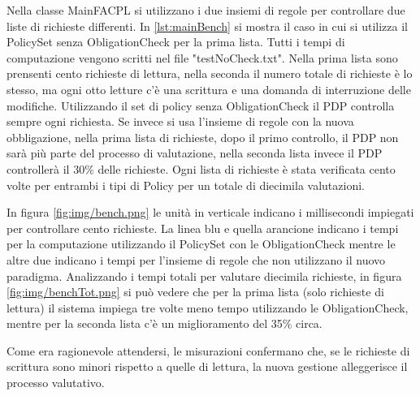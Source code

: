Nella classe MainFACPL si utilizzano i due insiemi di regole per controllare due liste di richieste differenti.
In \ref{lst:mainBench} si mostra il caso in cui si utilizza il PolicySet senza ObligationCheck per la prima lista.
Tutti i tempi di computazione vengono scritti nel file "testNoCheck.txt".
Nella prima lista sono prensenti cento richieste di lettura, nella seconda il numero totale di richieste è lo stesso,
ma ogni otto letture c'è una scrittura e una domanda di interruzione delle modifiche.
Utilizzando il set di policy senza ObligationCheck il PDP controlla sempre ogni richiesta. Se invece si usa l'insieme di regole
con la nuova obbligazione, nella prima lista di richieste, dopo il primo controllo, il PDP non sarà più parte del processo
di valutazione, nella seconda lista invece il PDP controllerà il 30\% delle richieste.
Ogni lista di richieste è stata verificata cento volte per entrambi i tipi di Policy per un totale di diecimila valutazioni.

In figura \ref{fig:img/bench.png} le unità in verticale indicano i millisecondi impiegati per controllare cento richieste.
La linea blu e quella arancione indicano i tempi per la computazione utilizzando il PolicySet con le ObligationCheck
mentre le altre due indicano i tempi per l'insieme di regole che non utilizzano il nuovo paradigma.
Analizzando i tempi totali per valutare diecimila richieste, in figura \ref{fig:img/benchTot.png} si può vedere che
per la prima lista (solo richieste di lettura) il sistema impiega tre volte meno tempo utilizzando le ObligationCheck, mentre per la
seconda lista c'è un miglioramento del 35\% circa.

Come era ragionevole attendersi, le misurazioni confermano che, se le richieste di scrittura sono minori rispetto a quelle di lettura, la nuova gestione
alleggerisce il processo valutativo.
